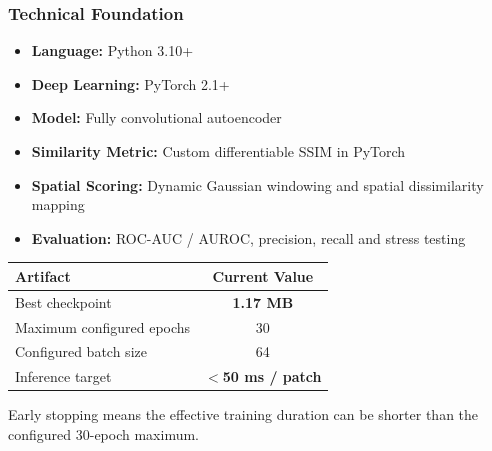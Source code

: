 \documentclass[aspectratio=169,11pt]{beamer}
\newcommand{\emphred}[1]{\textcolor{secondary}{#1}}
\newcommand{\good}[1]{\textcolor{accent}{\textbf{#1}}}
\begin{document}
\begin{frame}\frametitle{\emphred{Technical Foundation}}

\begin{itemize}
    \item \textbf{Language:} Python 3.10+
    \item \textbf{Deep Learning:} PyTorch 2.1+
    \item \textbf{Model:} Fully convolutional autoencoder
    \item \textbf{Similarity Metric:} Custom differentiable SSIM in PyTorch
    \item \textbf{Spatial Scoring:} Dynamic Gaussian windowing and spatial dissimilarity mapping
    \item \textbf{Evaluation:} ROC-AUC / AUROC, precision, recall and stress testing
\end{itemize}

\vspace{0.25cm}

\begin{center}
\small
\begin{tabular}{|l|c|}
\hline
\textbf{Artifact} & \textbf{Current Value} \\
\hline
Best checkpoint & \good{1.17 MB} \\
\hline
Maximum configured epochs & 30 \\
\hline
Configured batch size & 64 \\
\hline
Inference target & \good{$<$50 ms / patch} \\
\hline
\end{tabular}
\end{center}

\vspace{0.2cm}

\begin{center}
\footnotesize
Early stopping means the effective training duration can be
shorter than the configured 30-epoch maximum.
\end{center}

\end{frame}
\end{document}
